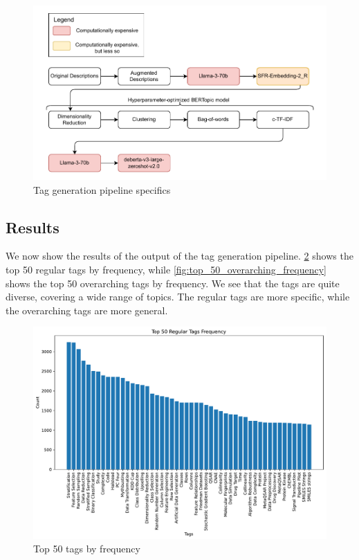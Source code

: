 \begin{figure}[h]
    \centering
    \includegraphics[width=\textwidth]{figures/tag_generation_pipeline_specifics.pdf}
    \caption{Tag generation pipeline specifics}
    \label{fig:tag_generation_pipeline_specifics}
\end{figure}

\subsection{Results}
We now show the results of the output of the tag generation pipeline. \cref{fig:top_50_frequency} shows the top 50 regular tags by frequency, while \cref{fig:top_50_overarching_frequency} shows the top 50 overarching tags by frequency. We see that the tags are quite diverse, covering a wide range of topics. The regular tags are more specific, while the overarching tags are more general.

\begin{figure}[h]
    \centering
    \includegraphics[width=\textwidth]{figures/top_50_frequency.pdf}
    \caption{Top 50 tags by frequency}
    \label{fig:top_50_frequency}
\end{figure}

